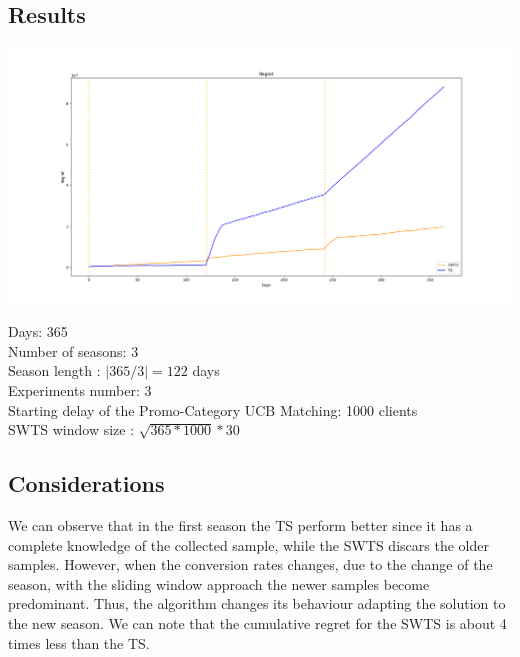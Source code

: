 \subsection*{Results}
\begin{center}
	\includegraphics[scale=0.30]{Images/n7}
\end{center}
Days: 365\\
Number of seasons: 3 \\
Season length : $|365/3| = 122 $ days\\
Experiments number: 3 \\
Starting delay of the Promo-Category UCB Matching: 1000 clients\\
SWTS window size : $\sqrt{365 * 1000} * 30$\\
\subsection*{Considerations}
We can observe that in the first season the TS perform better since it has a complete knowledge of the collected sample, while the SWTS discars the older samples. However, when the conversion rates changes, due to the change of the season, with the sliding window approach the newer samples become predominant. Thus, the algorithm changes its behaviour adapting the solution to the new season. We can note that the cumulative regret for the SWTS is about 4 times less than the TS. 